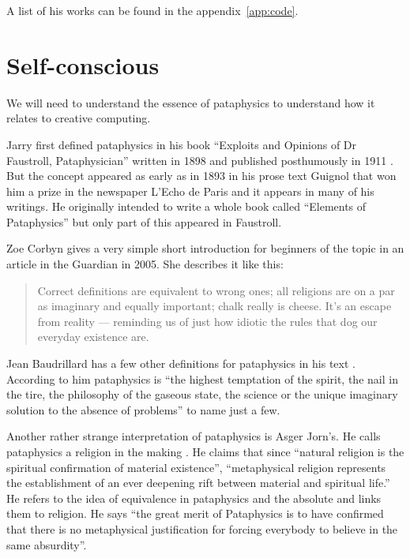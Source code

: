 A list of his works can be found in the appendix~\ref{app:code}.


\section{Self-conscious}

We will need to understand the essence of pataphysics to understand how it relates to creative computing.

Jarry first defined pataphysics in his book ``Exploits and Opinions of Dr Faustroll, Pataphysician'' written in 1898 and published posthumously in 1911 \autocite{Jarry1996}. But the concept appeared as early as in 1893 in his prose text Guignol that won him a prize in the newspaper L'Echo de Paris and it appears in many of his writings. He originally intended to write a whole book called ``Elements of Pataphysics'' but only part of this appeared in Faustroll.

Zoe Corbyn gives a very simple short introduction for beginners of the topic in an article in the Guardian \autocite{Corbyn2005} in 2005. She describes it like this:

\begin{quote}
  Correct definitions are equivalent to wrong ones; all religions are on a par as imaginary and equally important; chalk really is cheese. It's an escape from reality --- reminding us of just how idiotic the rules that dog our everyday existence are. \autocite{Jarry1996}
\end{quote}

Jean Baudrillard has a few other definitions for pataphysics in his text \autocite{Baudrillard2007}. According to him pataphysics is ``the highest temptation of the spirit, the nail in the tire, the philosophy of the gaseous state, the science or the unique imaginary solution to the absence of problems'' to name just a few.

Another rather strange interpretation of pataphysics is Asger Jorn's. He calls pataphysics a religion in the making \autocite{Jorn1961}. He claims that since ``natural religion is the spiritual confirmation of material existence'', ``metaphysical religion represents the establishment of an ever deepening rift between material and spiritual life.'' He refers to the idea of equivalence in pataphysics and the absolute and links them to religion. He says ``the great merit of Pataphysics is to have confirmed that there is no metaphysical justification for forcing everybody to believe in the same absurdity''.

